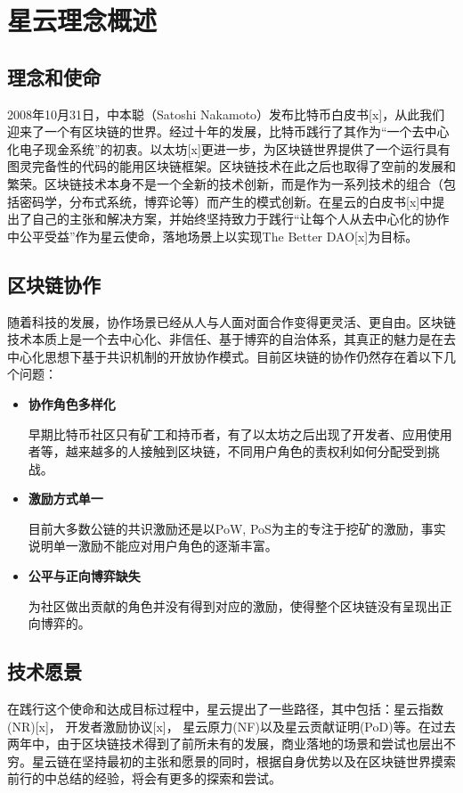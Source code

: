 \section{星云理念概述}

\subsection{理念和使命}
2008年10⽉31⽇，中本聪（Satoshi Nakamoto）发布⽐特币⽩⽪书[x]，从此我们迎来了⼀个有区块链的世界。经过十年的发展，⽐特币践⾏了其作为“⼀个去中⼼化电⼦现⾦系统”的初衷。以太坊[x]更进一步，为区块链世界提供了一个运行具有图灵完备性的代码的能用区块链框架。区块链技术在此之后也取得了空前的发展和繁荣。区块链技术本身不是一个全新的技术创新，而是作为一系列技术的组合（包括密码学，分布式系统，博弈论等）而产生的模式创新。在星云的白皮书[x]中提出了自己的主张和解决方案，并始终坚持致力于践行“让每个人从去中心化的协作中公平受益”作为星云使命，落地场景上以实现The Better DAO[x]为目标。


\subsection{区块链协作}
随着科技的发展，协作场景已经从人与人面对面合作变得更灵活、更自由。区块链技术本质上是一个去中心化、非信任、基于博弈的自治体系，其真正的魅力是在去中心化思想下基于共识机制的开放协作模式。目前区块链的协作仍然存在着以下几个问题：

\begin{itemize}

	\item \textbf{协作角色多样化}

	早期比特币社区只有矿工和持币者，有了以太坊之后出现了开发者、应用使用者等，越来越多的人接触到区块链，不同用户角色的责权利如何分配受到挑战。

	\item \textbf{激励方式单一}

	目前大多数公链的共识激励还是以PoW, PoS为主的专注于挖矿的激励，事实说明单一激励不能应对用户角色的逐渐丰富。

	\item \textbf{公平与正向博弈缺失}

	为社区做出贡献的角色并没有得到对应的激励，使得整个区块链没有呈现出正向博弈的。

\end{itemize}

\subsection{技术愿景}
在践行这个使命和达成目标过程中，星云提出了一些路径，其中包括：星云指数(NR)[x]， 开发者激励协议[x]， 星云原力(NF)以及星云贡献证明(PoD)等。在过去两年中，由于区块链技术得到了前所未有的发展，商业落地的场景和尝试也层出不穷。星云链在坚持最初的主张和愿景的同时，根据自身优势以及在区块链世界摸索前行的中总结的经验，将会有更多的探索和尝试。
